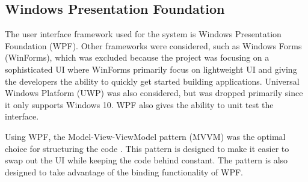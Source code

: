 \subsection{Windows Presentation Foundation} \label{ssc:tech_wpf}
The user interface framework used for the system is Windows Presentation Foundation (WPF). Other frameworks were considered, such as Windows Forms (WinForms), which was excluded because the project was focusing on a sophisticated UI where WinForms primarily focus on lightweight UI and giving the developers the ability to quickly get started building applications. 
Universal Windows Platform (UWP) was also considered, but was dropped primarily since it only supports Windows 10. WPF also gives the ability to unit test the interface.

\par

Using WPF, the Model-View-ViewModel pattern (MVVM) was the optimal choice for structuring the code \citep{WPFandMVVM}. This pattern is designed to make it easier to swap out the UI while keeping the code behind constant. The pattern is also designed to take advantage of the binding functionality of WPF. \citep{MvvmBasics, Bindings}